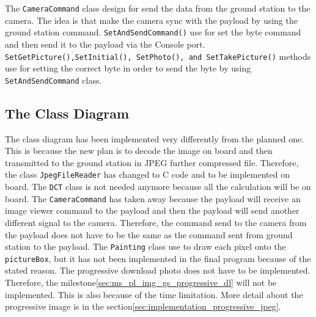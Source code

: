 The \texttt{CameraCommand} class design for send the data from the ground station to the camera. The idea is that make the camera sync with the payload by using the ground station command. \texttt{SetAndSendCommand()} use for set the byte command and then send it to the payload via the Console port. \texttt{SetGetPicture(),SetInitial(), SetPhoto(), and SetTakePicture()} methods use for setting the correct byte in order to send the byte by using \texttt{SetAndSendCommand} class.

\subsection*{The Class Diagram}
The class diagram has been implemented very differently from the planned one.
This is because the new plan is to decode the image on board and then transmitted to the ground station in JPEG further compressed file. 
Therefore, the class \texttt{JpegFileReader} has changed to C code and to be implemented on board. 
The \texttt{DCT} class is not needed anymore because all the calculation will be on board. 
The \texttt{CameraCommand} has taken away because the payload will receive an image viewer command to the payload and then the payload will send another different signal to the camera.
Therefore, the command send to the camera from the payload does not have to be the same as the command sent from ground station to the payload. 
The \texttt{Painting} class use to draw each pixel onto the \texttt{pictureBox}, but it has not been implemented in the final program because of the stated reason.
The progressive download photo does not have to be implemented. 
Therefore, the milestone\ref{sec:ms_pl_img_gs_progressive_dl} will not be implemented.
This is also because of the time limitation.
More detail about the progressive image is in the section\ref{sec:implementation_progressive_jpeg}.
 
